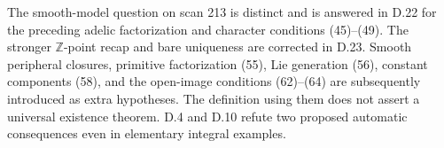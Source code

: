 The smooth-model question on scan 213 is distinct and is answered
in D.22 for the preceding adelic factorization and character
conditions (45)--(49). The stronger $\mathbb Z$-point recap
and bare uniqueness are corrected in D.23. Smooth peripheral
closures, primitive factorization (55), Lie generation (56),
constant components (58), and the open-image conditions
(62)--(64) are subsequently introduced as extra hypotheses.
The definition using them does not assert a universal existence
theorem. D.4 and D.10 refute two proposed automatic consequences
even in elementary integral examples.
